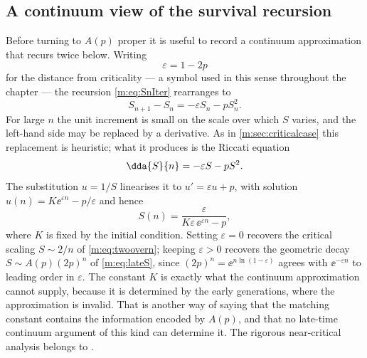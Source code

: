 \subsection{A continuum view of the survival recursion}
\label{m:sec:riccati}

Before turning to $A(p)$ proper it is useful to record a continuum approximation
that recurs twice below. Writing
\begin{equation}
\label{m:eq:epsdef}
\varepsilon = 1-2p
\end{equation}
for the distance from criticality --- a symbol used in this sense throughout the
chapter --- the recursion \cref{m:eq:SnIter} rearranges to
\begin{equation}
\label{m:eq:Sdiff}
S_{n+1}-S_n = -\varepsilon S_n - pS_n^2 .
\end{equation}
For large $n$ the unit increment is small on the scale over which $S$ varies, and
the left-hand side may be replaced by a derivative. As in \cref{m:sec:criticalcase}
this replacement is heuristic; what it produces is the Riccati equation
\begin{equation}
\label{m:eq:riccati}
\dda{S}{n} = -\varepsilon S - pS^2 .
\end{equation}
The substitution $u=1/S$ linearises it to $u' = \varepsilon u + p$, with solution
$u(n) = K\ee^{\varepsilon n}-p/\varepsilon$ and hence
\begin{equation}
\label{m:eq:riccatisol}
S(n) = \frac{\varepsilon}{K\varepsilon\,\ee^{\varepsilon n}-p},
\end{equation}
where $K$ is fixed by the initial condition. Setting $\varepsilon=0$ recovers the
critical scaling $S\sim2/n$ of \cref{m:eq:twoovern}; keeping $\varepsilon>0$ recovers
the geometric decay $S\sim A(p)(2p)^n$ of \cref{m:eq:lateS}, since
$(2p)^n = \ee^{n\ln(1-\varepsilon)}$ agrees with $\ee^{-\varepsilon n}$ to leading
order in $\varepsilon$. The
constant $K$ is exactly what the continuum approximation cannot supply, because it
is determined by the early generations, where the approximation is invalid. That is
another way of saying that the matching constant contains the information encoded
by $A(p)$, and that no late-time continuum argument of this kind can determine it.
The rigorous near-critical analysis belongs to \ChA.

\FloatBarrier
